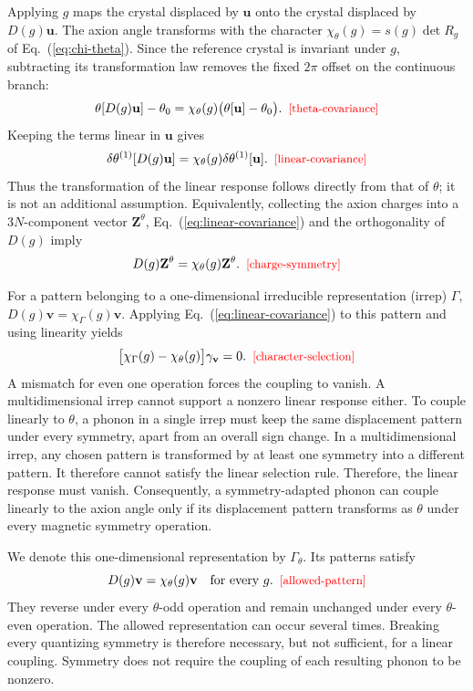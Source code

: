 \documentclass[galley,aps,pra,10pt,amsmath,amssymb,
    superscriptaddress,nofootinbib,longbibliography]{revtex4-2}
\def\Red#1{\textcolor{red}{#1}}
\newcounter{comm}
\newcommand{\eqlab}[1]{\Red{\hbox{\small\;\;[#1]}}\label{eq:#1}}
\newcommand{\eqlab}[1]{\label{eq:#1}}
\newcommand{\eq}[1]{Eq.~(\ref{eq:#1})}
\begin{document}
Applying $g$ maps the crystal displaced by $\mathbf u$ onto the crystal displaced by $D(g)\mathbf u$. The axion angle transforms with the character $\chi_\theta(g)=s(g)\det R_g$ of \eq{chi-theta}. Since the reference crystal is invariant under $g$, subtracting its transformation law removes the fixed $2\pi$ offset on the continuous branch:
\begin{equation}
\theta[D(g)\mathbf u]-\theta_0
=\chi_\theta(g)\bigl(\theta[\mathbf u]-\theta_0\bigr).
\eqlab{theta-covariance}
\end{equation}
Keeping the terms linear in $\mathbf u$ gives
\begin{equation}
\delta\theta^{(1)}[D(g)\mathbf u]
=\chi_\theta(g)\delta\theta^{(1)}[\mathbf u].
\eqlab{linear-covariance}
\end{equation}
Thus the transformation of the linear response follows directly from that of $\theta$; it is not an additional assumption. Equivalently, collecting the axion charges into a $3N$-component vector $\mathbf Z^\theta$, \eq{linear-covariance} and the orthogonality of $D(g)$ imply
\begin{equation}
D(g)\mathbf Z^\theta=\chi_\theta(g)\mathbf Z^\theta.
\eqlab{charge-symmetry}
\end{equation}

For a pattern belonging to a one-dimensional irreducible representation (irrep) $\Gamma$, $D(g)\mathbf v=\chi_\Gamma(g)\mathbf v$. Applying \eq{linear-covariance} to this pattern and using linearity yields
\begin{equation}
\bigl[\chi_\Gamma(g)-\chi_\theta(g)\bigr]
\gamma_{\mathbf v}=0.
\eqlab{character-selection}
\end{equation}
A mismatch for even one operation forces the coupling to vanish. A multidimensional irrep cannot support a nonzero linear response either. To couple linearly to $\theta$, a phonon in a single irrep must keep the same displacement pattern under every symmetry, apart from an overall sign change. In a multidimensional irrep, any chosen pattern is transformed by at least one symmetry into a different pattern. It therefore cannot satisfy the linear selection rule. Therefore, the linear response must vanish. Consequently, a symmetry-adapted phonon can couple linearly to the axion angle only if its displacement pattern transforms as $\theta$ under every magnetic symmetry operation.

We denote this one-dimensional representation by $\Gamma_\theta$. Its patterns satisfy
\begin{equation}
D(g)\mathbf v=\chi_\theta(g)\mathbf v
\quad\text{for every }g.
\eqlab{allowed-pattern}
\end{equation}
They reverse under every $\theta$-odd operation and remain unchanged under every $\theta$-even operation. The allowed representation can occur several times. Breaking every quantizing symmetry is therefore necessary, but not sufficient, for a linear coupling. Symmetry does not require the coupling of each resulting phonon to be nonzero.
\end{document}
